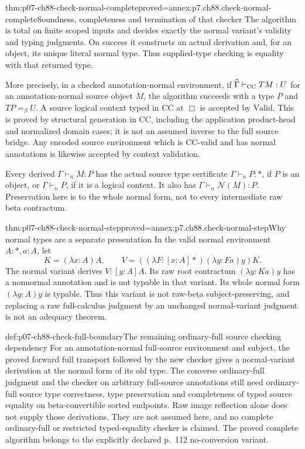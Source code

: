 \begin{hbtheorem}{thm:p07-ch88-check-normal-complete}{proved=annex:p7.ch88.check-normal-complete}{Soundness, completeness and termination of that checker}
The algorithm is total on finite scoped inputs and decides exactly the
normal variant's validity and typing judgments. On success it constructs
an actual derivation and, for an object, its unique literal normal type.
Thus supplied-type checking is equality with that returned type.

More precisely, in a checked annotation-normal environment, if
\(\widehat\Gamma\vdash_{\rm CC}TM:U\) for an annotation-normal
source object \(M\), the algorithm succeeds with a type \(P\) and
\(TP=_\beta U\). A source logical context typed in CC at \(\Box\)
is accepted by \(\mathrm{Valid}\). This is proved by structural
generation in CC, including the application product-head and normalized
domain cases; it is not an assumed inverse to the full source bridge.
Any encoded source environment which is CC-valid and has normal
annotations is likewise accepted by context validation.

Every derived \(\Gamma\vdash_n M:P\) has the actual source type
certificate \(\Gamma\vdash_n P:\ast\), if \(P\) is an object,
or \(\Gamma\vdash_n P\), if it is a logical context. It also has
\(\Gamma\vdash_n\mathcal N(M):P\). Preservation here is to the
whole normal form, not to every intermediate raw beta contractum.
\end{hbtheorem}

\begin{hbtheorem}{thm:p07-ch88-check-normal-step}{proved=annex:p7.ch88.check-normal-step}{Why normal types are a separate presentation}
In the valid normal environment \(A:\ast,a:A\), let
\[
 K=(\lambda x:A)A,\qquad
 V=((\lambda F:[x:A]\ast)(\lambda y:Fa)y)K.
\]
The normal variant derives \(V:[y:A]A\). Its raw root contractum
\((\lambda y:Ka)y\) has a nonnormal annotation and is not typable
in that variant. Its whole normal form \((\lambda y:A)y\) is typable.
Thus this variant is not raw-beta subject-preserving, and replacing a
raw full-calculus judgment by an unchanged normal-variant judgment is
not an adequacy theorem.
\end{hbtheorem}

\begin{proofboundary}{def:p07-ch88-check-full-boundary}{The remaining ordinary-full source checking dependency}
\label{def:p07-ch88-source-checking-boundary}
For an annotation-normal full-source environment and subject, the proved
forward full transport followed by the new checker gives a normal-variant
derivation at the normal form of its old type. The converse ordinary-full
judgment and the checker on arbitrary full-source annotations still need
ordinary-full source type correctness, type preservation and completeness of typed source
equality on beta-convertible sorted endpoints. Raw image reflection alone
does not supply those derivations. They are not assumed here, and no
complete ordinary-full or restricted typed-equality checker is claimed.
The proved complete algorithm belongs to the explicitly declared p.~112
no-conversion variant.
\end{proofboundary}
